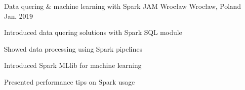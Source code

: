 
\begin{cventries}

    \cventry
    {Data quering & machine learning with Spark}
    {JAM Wrocław}
    {Wrocław, Poland}
    {Jan. 2019}
    {
    \begin{cvitems}
        \item {Introduced data quering solutions with Spark SQL module}
        \item {Showed data processing using Spark pipelines}
        \item {Introduced Spark MLlib for machine learning}
        \item {Presented performance tips on Spark usage}
    \end{cvitems}
    }

\end{cventries}
